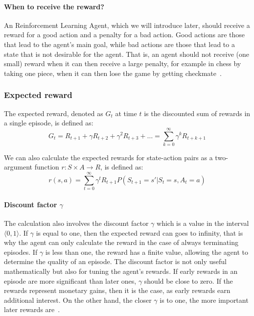 \documentclass[../xlapes02]{subfiles}
\begin{document}
    \paragraph{When to receive the reward?} An Reinforcement Learning Agent, which we will introduce later, should receive a reward for a good action and a penalty for a bad action. Good actions are those that lead to the agent's main goal, while bad actions are those that lead to a state that is not desirable for the agent. That is, an agent should not receive (one small) reward when it can then receive a large penalty, for example in chess by taking one piece, when it can then lose the game by getting checkmate~\cite{sutton2018reinforcement}.

    \subsubsection{Expected reward}\label{par:expected-reward}
    The expected reward, denoted as $G_t$ at time $t$ is the discounted sum of rewards in a single episode, is defined as:
    \begin{equation}
        G_t=R_{t+1}+\gamma R_{t+2}+\gamma^2 R_{t+3}+\ldots=\sum_{k=0}^{\infty}\gamma^k R_{t+k+1}
    \end{equation}

    We can also calculate the expected rewards for state-action pairs as a two-argument function $r:S\times A\to R$, is defined as:
    \begin{equation}
        r(s,a)=\sum_{t=0}^{\infty}\gamma^t R_{t+1} P(S_{t+1}=s'|S_t=s,A_t=a)
    \end{equation}

    \paragraph{Discount factor $\gamma$}\label{par:discount-factor}
    The calculation also involves the discount factor $\gamma$ which is a value in the interval $\langle 0, 1 \rangle$. If $\gamma$ is equal to one, then the expected reward can goes to infinity, that is why the agent can only calculate the reward in the case of always terminating episodes. If $\gamma$ is less than one, the reward has a finite value, allowing the agent to determine the quality of an episode. The discount factor is not only useful mathematically but also for tuning the agent's rewards. If early rewards in an episode are more significant than later ones, $\gamma$ should be close to zero. If the rewards represent monetary gains, then it is the case, as early rewards earn additional interest. On the other hand, the closer $\gamma$ is to one, the more important later rewards are~\cite{rao2022foundations, sutton2018reinforcement, perotto:hal-02363599}.
\end{document}
